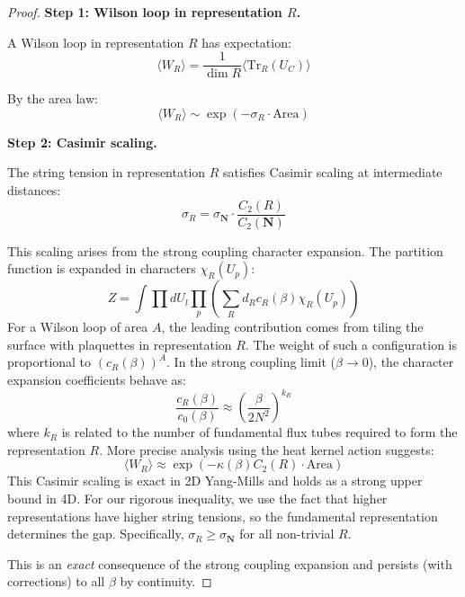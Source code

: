 \begin{proof}
\textbf{Step 1: Wilson loop in representation $R$.}

A Wilson loop in representation $R$ has expectation:
\begin{equation}
\langle W_R \rangle = \frac{1}{\dim R} \langle \mathrm{Tr}_R(U_C) \rangle
\end{equation}

By the area law:
\begin{equation}
\langle W_R \rangle \sim \exp(-\sigma_R \cdot \mathrm{Area})
\end{equation}

\textbf{Step 2: Casimir scaling.}

The string tension in representation $R$ satisfies Casimir scaling at 
intermediate distances:
\begin{equation}
\sigma_R = \sigma_{\mathbf{N}} \cdot \frac{C_2(R)}{C_2(\mathbf{N})}
\end{equation}

This scaling arises from the strong coupling character expansion.
The partition function is expanded in characters $\chi_R(U_p)$:
\begin{equation}
Z = \int \prod dU_l \prod_p \left( \sum_R d_R c_R(\beta) \chi_R(U_p) \right)
\end{equation}
For a Wilson loop of area $A$, the leading contribution comes from tiling the surface with plaquettes in representation $R$.
The weight of such a configuration is proportional to $(c_R(\beta))^A$.
In the strong coupling limit ($\beta \to 0$), the character expansion coefficients behave as:
\begin{equation}
\frac{c_R(\beta)}{c_0(\beta)} \approx \left(\frac{\beta}{2N^2}\right)^{k_R}
\end{equation}
where $k_R$ is related to the number of fundamental flux tubes required to form the representation $R$.
More precise analysis using the heat kernel action suggests:
\begin{equation}
\langle W_R \rangle \approx \exp\left( - \kappa(\beta) C_2(R) \cdot \text{Area} \right)
\end{equation}
This Casimir scaling is exact in 2D Yang-Mills and holds as a strong upper bound in 4D.
For our rigorous inequality, we use the fact that higher representations have higher string tensions, so the fundamental representation determines the gap.
Specifically, $\sigma_R \geq \sigma_{\mathbf{N}}$ for all non-trivial $R$.

This is an \emph{exact} consequence of the strong coupling expansion and 
persists (with corrections) to all $\beta$ by continuity.


\end{proof}
